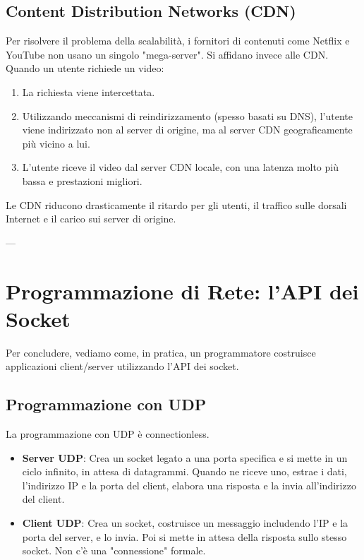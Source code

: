 \subsection{Content Distribution Networks (CDN)}
Per risolvere il problema della scalabilità, i fornitori di contenuti come Netflix e YouTube non usano un singolo "mega-server". Si affidano invece alle CDN.
Quando un utente richiede un video:
\begin{enumerate}
    \item La richiesta viene intercettata.
    \item Utilizzando meccanismi di reindirizzamento (spesso basati su DNS), l'utente viene indirizzato non al server di origine, ma al server CDN geograficamente più vicino a lui.
    \item L'utente riceve il video dal server CDN locale, con una latenza molto più bassa e prestazioni migliori.
\end{enumerate}
Le CDN riducono drasticamente il ritardo per gli utenti, il traffico sulle dorsali Internet e il carico sui server di origine.

---

\section{Programmazione di Rete: l'API dei Socket}
Per concludere, vediamo come, in pratica, un programmatore costruisce applicazioni client/server utilizzando l'API dei socket.

\subsection{Programmazione con UDP}
La programmazione con UDP è connectionless.
\begin{itemize}
    \item \textbf{Server UDP}: Crea un socket legato a una porta specifica e si mette in un ciclo infinito, in attesa di datagrammi. Quando ne riceve uno, estrae i dati, l'indirizzo IP e la porta del client, elabora una risposta e la invia all'indirizzo del client.
    \item \textbf{Client UDP}: Crea un socket, costruisce un messaggio includendo l'IP e la porta del server, e lo invia. Poi si mette in attesa della risposta sullo stesso socket. Non c'è una "connessione" formale.
\end{itemize}

